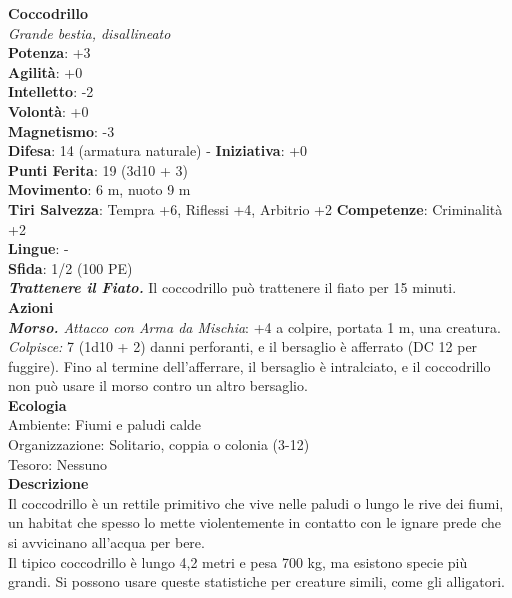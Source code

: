 \begin{multicols}{2}
\medskip\textbf{Coccodrillo}\\
\emph{Grande bestia, disallineato}\\
\textbf{Potenza}: +3\\
\textbf{Agilità}: +0\\
\textbf{Intelletto}: -2\\
\textbf{Volontà}: +0\\
\textbf{Magnetismo}: -3\\
\textbf{Difesa}: 14 (armatura naturale) - \textbf{Iniziativa}: +0\\
\textbf{Punti Ferita}: 19 (3d10 + 3)\\
\textbf{Movimento}: 6 m, nuoto 9 m\\
\textbf{Tiri Salvezza}: Tempra +6, Riflessi +4, Arbitrio +2 
\textbf{Competenze}: Criminalità +2\\
\textbf{Lingue}: -\\
\textbf{Sfida}: 1/2 (100 PE)\smallskip\\
\emph{\textbf{Trattenere il Fiato.}} Il coccodrillo può trattenere il fiato per 15 minuti.\\
\smallskip\textbf{Azioni}\\
\emph{\textbf{Morso.} Attacco con Arma da Mischia}: +4 a colpire, portata 1 m, una creatura.\\
\emph{Colpisce:} 7 (1d10 + 2) danni perforanti, e il bersaglio è afferrato (DC 12 per fuggire). Fino al termine dell'afferrare, il bersaglio è intralciato, e il coccodrillo non può usare il morso contro un altro bersaglio.\\
\textbf{Ecologia}\\
Ambiente: Fiumi e paludi calde\\
Organizzazione: Solitario, coppia o colonia (3-12)\\
Tesoro: Nessuno\\
\textbf{Descrizione}\\
Il coccodrillo è un rettile primitivo che vive nelle paludi o lungo le rive dei fiumi, un habitat che spesso lo mette violentemente in contatto con le ignare prede che si avvicinano all'acqua per bere.\\

Il tipico coccodrillo è lungo 4,2 metri e pesa 700 kg, ma esistono specie più grandi. Si possono usare queste statistiche per creature simili, come gli alligatori. \\



\end{multicols}
